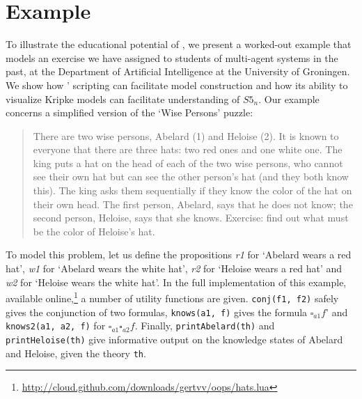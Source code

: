 \section{Example}
\label{sec:example}

To illustrate the educational potential of \oops\/, we present a worked-out example that models an exercise we have assigned to students of multi-agent systems in the past, at the Department of Artificial Intelligence at the University of Groningen.
We show how \oops' scripting can facilitate model construction and how its ability to visualize Kripke models can facilitate understanding of $S5_n$.
Our example concerns a simplified version of the `Wise Persons' puzzle:

\begin{quote}
There are two wise persons, Abelard (1) and Heloise (2). It is known to everyone that there are three hats: two red ones and one white one. The king puts a hat on the head of each of the two wise persons, who cannot see their own hat but can see the other person's hat (and they both know this). The king asks them sequentially if they know the color of the hat on their own head. The first person, Abelard, says that he does not know; the second person, Heloise, says that she knows.
Exercise: find out what must be the color of Heloise's hat.
\end{quote}

To model this problem,
let us define the propositions {\it r1} for `Abelard wears a red hat', {\it w1} for `Abelard wears the white hat', {\it r2} for `Heloise wears a red hat' and {\it w2} for `Heloise wears the white hat'.
In the full implementation of this example, available online,\footnote{\url{http://cloud.github.com/downloads/gertvv/oops/hats.lua}} a number of utility functions are given.
{\tt conj(f1, f2)} safely gives the conjunction of two formulas, {\tt knows(a1, f)} gives the formula $\square_{a1} f$' and {\tt knows2(a1, a2, f)} for $\square_{a1} \square_{a2} f$.
Finally, {\tt printAbelard(th)} and {\tt printHeloise(th)} give informative output on the knowledge states of Abelard and Heloise, given the theory {\tt th}.

